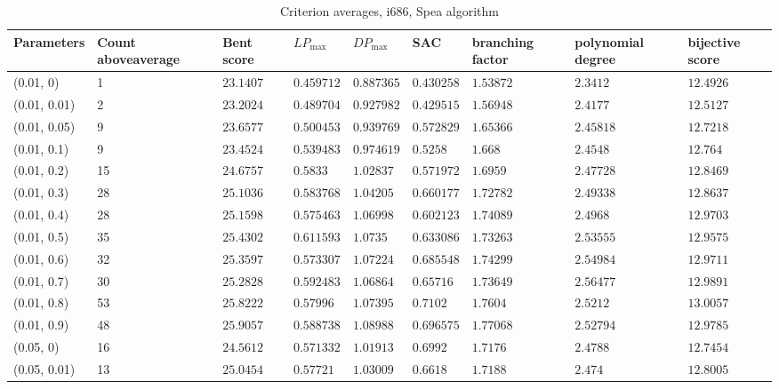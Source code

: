 \begin{center}
{\begin{longtable}{| l | p{} |  p{} | p{} | p{} | p{} | p{} | p{} | p{} |}
\caption{Criterion averages, i686, Spea algorithm}\label{tabSpeaParametersLuffa}\\
\hline
Parameters & Count above\-average  & Bent score & $LP_{\max}$ & $DP_{\max}$ & SAC & branching factor & polynomial degree & bijective score \\ \hline
\endhead
 (0.01, 0) & 1  & $23.1407$ & $0.459712$ & $0.887365$ & $0.430258$ & $1.53872$ & $2.3412$ & $12.4926$ \\ \hline
 (0.01, 0.01) & 2  & $23.2024$ & $0.489704$ & $0.927982$ & $0.429515$ & $1.56948$ & $2.4177$ & $12.5127$ \\ \hline
 (0.01, 0.05) & 9  & $23.6577$ & $0.500453$ & $0.939769$ & $0.572829$ & $1.65366$ & $2.45818$ & $12.7218$ \\ \hline
 (0.01, 0.1) & 9  & $23.4524$ & $0.539483$ & $0.974619$ & $0.5258$ & $1.668$ & $2.4548$ & $12.764$ \\ \hline
 (0.01, 0.2) & 15  & $24.6757$ & $0.5833$ & $1.02837$ & $0.571972$ & $1.6959$ & $2.47728$ & $12.8469$ \\ \hline
 (0.01, 0.3) & 28  & $25.1036$ & $0.583768$ & $1.04205$ & $0.660177$ & $1.72782$ & $2.49338$ & $12.8637$ \\ \hline
 (0.01, 0.4) & 28  & $25.1598$ & $0.575463$ & $1.06998$ & $0.602123$ & $1.74089$ & $2.4968$ & $12.9703$ \\ \hline
 (0.01, 0.5) & 35  & $25.4302$ & $0.611593$ & $1.0735$ & $0.633086$ & $1.73263$ & $2.53555$ & $12.9575$ \\ \hline
 (0.01, 0.6) & 32  & $25.3597$ & $0.573307$ & $1.07224$ & $0.685548$ & $1.74299$ & $2.54984$ & $12.9711$ \\ \hline
 (0.01, 0.7) & 30  & $25.2828$ & $0.592483$ & $1.06864$ & $0.65716$ & $1.73649$ & $2.56477$ & $12.9891$ \\ \hline
 (0.01, 0.8) & 53  & $25.8222$ & $0.57996$ & $1.07395$ & $0.7102$ & $1.7604$ & $2.5212$ & $13.0057$ \\ \hline
 (0.01, 0.9) & 48  & $25.9057$ & $0.588738$ & $1.08988$ & $0.696575$ & $1.77068$ & $2.52794$ & $12.9785$ \\ \hline
 (0.05, 0) & 16  & $24.5612$ & $0.571332$ & $1.01913$ & $0.6992$ & $1.7176$ & $2.4788$ & $12.7454$ \\ \hline
 (0.05, 0.01) & 13  & $25.0454$ & $0.57721$ & $1.03009$ & $0.6618$ & $1.7188$ & $2.474$ & $12.8005$ \\ \hline

\end{longtable}}
\end{center}
